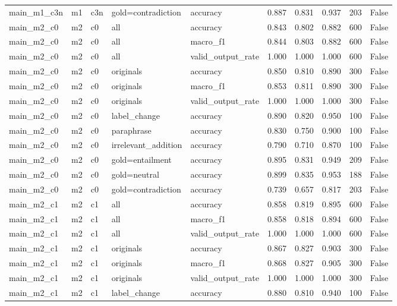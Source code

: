 \begin{tabular}{llllllllll}
main\_m1\_c3n & m1 & c3n & gold=contradiction & accuracy & 0.887 & 0.831 & 0.937 & 203 & False \\
main\_m2\_c0 & m2 & c0 & all & accuracy & 0.843 & 0.802 & 0.882 & 600 & False \\
main\_m2\_c0 & m2 & c0 & all & macro\_f1 & 0.844 & 0.803 & 0.882 & 600 & False \\
main\_m2\_c0 & m2 & c0 & all & valid\_output\_rate & 1.000 & 1.000 & 1.000 & 600 & False \\
main\_m2\_c0 & m2 & c0 & originals & accuracy & 0.850 & 0.810 & 0.890 & 300 & False \\
main\_m2\_c0 & m2 & c0 & originals & macro\_f1 & 0.853 & 0.811 & 0.890 & 300 & False \\
main\_m2\_c0 & m2 & c0 & originals & valid\_output\_rate & 1.000 & 1.000 & 1.000 & 300 & False \\
main\_m2\_c0 & m2 & c0 & label\_change & accuracy & 0.890 & 0.820 & 0.950 & 100 & False \\
main\_m2\_c0 & m2 & c0 & paraphrase & accuracy & 0.830 & 0.750 & 0.900 & 100 & False \\
main\_m2\_c0 & m2 & c0 & irrelevant\_addition & accuracy & 0.790 & 0.710 & 0.870 & 100 & False \\
main\_m2\_c0 & m2 & c0 & gold=entailment & accuracy & 0.895 & 0.831 & 0.949 & 209 & False \\
main\_m2\_c0 & m2 & c0 & gold=neutral & accuracy & 0.899 & 0.835 & 0.953 & 188 & False \\
main\_m2\_c0 & m2 & c0 & gold=contradiction & accuracy & 0.739 & 0.657 & 0.817 & 203 & False \\
main\_m2\_c1 & m2 & c1 & all & accuracy & 0.858 & 0.819 & 0.895 & 600 & False \\
main\_m2\_c1 & m2 & c1 & all & macro\_f1 & 0.858 & 0.818 & 0.894 & 600 & False \\
main\_m2\_c1 & m2 & c1 & all & valid\_output\_rate & 1.000 & 1.000 & 1.000 & 600 & False \\
main\_m2\_c1 & m2 & c1 & originals & accuracy & 0.867 & 0.827 & 0.903 & 300 & False \\
main\_m2\_c1 & m2 & c1 & originals & macro\_f1 & 0.868 & 0.827 & 0.905 & 300 & False \\
main\_m2\_c1 & m2 & c1 & originals & valid\_output\_rate & 1.000 & 1.000 & 1.000 & 300 & False \\
main\_m2\_c1 & m2 & c1 & label\_change & accuracy & 0.880 & 0.810 & 0.940 & 100 & False \\

\end{tabular}

